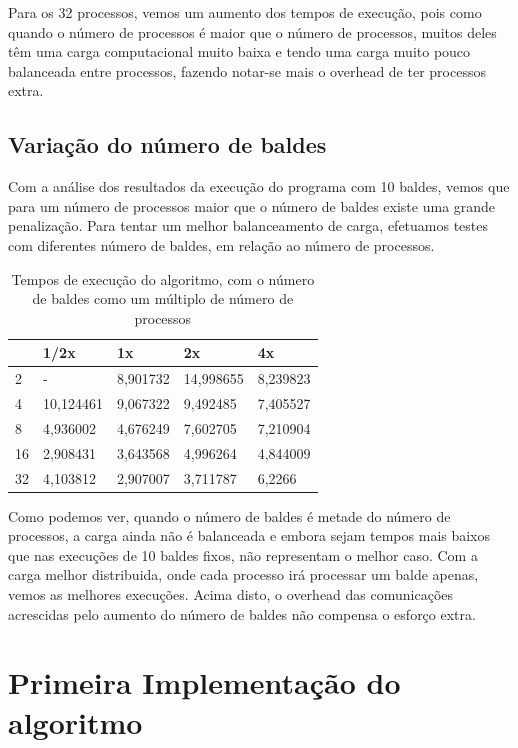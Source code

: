 \documentclass[a4paper]{report}
\begin{document}
Para os 32 processos, vemos um aumento dos tempos de execução, pois como quando
o número de processos é maior que o número de processos, muitos deles têm uma
carga computacional muito baixa e tendo uma carga muito pouco balanceada entre
processos, fazendo notar-se mais o overhead de ter processos extra.

\section{Variação do número de baldes}

Com a análise dos resultados da execução do programa com 10 baldes, vemos que
para um número de processos maior que o número de baldes existe uma grande
penalização. Para tentar um melhor balanceamento de carga, efetuamos testes com
diferentes número de baldes, em relação ao número de processos.

\begin{table}[h]
    \centering
    \begin{tabular}{|l|l|l|l|l|}
        \hline
   & 1/2x      & 1x       & 2x        & 4x       \\ \hline
        2  & -         & 8,901732 & 14,998655 & 8,239823 \\ \hline
        4  & 10,124461 & 9,067322 & 9,492485  & 7,405527 \\ \hline
        8  & 4,936002  & 4,676249 & 7,602705  & 7,210904 \\ \hline
        16 & 2,908431  & 3,643568 & 4,996264  & 4,844009 \\ \hline
        32 & 4,103812  & 2,907007 & 3,711787  & 6,2266   \\ \hline
    \end{tabular}
    \caption{\label{tab:varb}Tempos de execução do algoritmo, com o número de
    baldes como um múltiplo de número de processos}
\end{table}

Como podemos ver, quando o número de baldes é metade do número de processos, a
carga ainda não é balanceada e embora sejam tempos mais baixos que nas execuções
de 10 baldes fixos, não representam o melhor caso. Com a carga melhor
distribuida, onde cada processo irá processar um balde apenas, vemos as melhores
execuções. Acima disto, o overhead das comunicações acrescidas pelo aumento do
número de baldes não compensa o esforço extra.

\appendix

\chapter{Primeira Implementação do algoritmo} \label{apx:slowpar}
\end{document}
